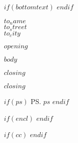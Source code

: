 \documentclass[$fontsize$,a4paper]{dinbrief}
\begin{document}
$if(bottomtext)$
\bottomtext{\

}
$endif$

\subject{\textbf{$subject$}}
\date{$if(customdate)$$else$\today$endif$}
\begin{letter}{
\textsf{$to_name$ \\
$to_street$ \\[\medskipamount]
$to_city$}}

\opening{$opening$}


$body$


{
    \closing[{\texttt{[image: \$signature\$]}}]{$closing$}
}
{
    \closing[]{$closing$}
}

$if(ps)$
\ps{$ps$}
$endif$

$if(encl)$
$endif$

$if(cc)$
$endif$

\end{letter}
\end{document}
